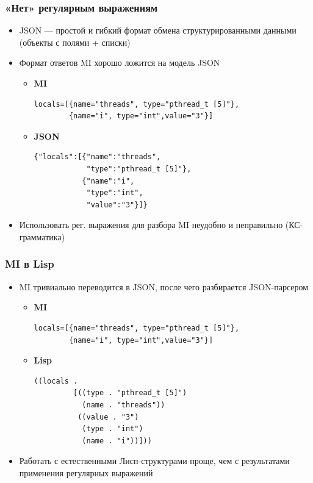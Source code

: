 \documentclass[onlymath]{beamer}
\begin{document}
\begin{frame}[fragile]
  \frametitle{«Нет» регулярным выражениям}
  \begin{itemize}
  \item JSON — простой и гибкий формат обмена структурированными
    данными (объекты с полями + списки)
  \item Формат ответов MI хорошо ложится на модель JSON
    \begin{itemize}
    \item \textbf{MI}
\begin{lstlisting}
locals=[{name="threads", type="pthread_t [5]"},
        {name="i", type="int",value="3"}]
\end{lstlisting}

    \item \textbf{JSON}
\begin{lstlisting}
{"locals":[{"name":"threads", 
            "type":"pthread_t [5]"},
           {"name":"i", 
            "type":"int", 
            "value":"3"}]}
\end{lstlisting}
    \end{itemize}
  \item Использовать рег. выражения для разбора MI неудобно и
    неправильно (КС-грамматика)
  \end{itemize}
\end{frame}

\begin{frame}[fragile]
  \frametitle{MI в Lisp}
  \begin{itemize}
  \item MI тривиально переводится в JSON, после чего разбирается
    JSON-парсером
    \begin{itemize}
    \item \textbf{MI}
\begin{lstlisting}
locals=[{name="threads", type="pthread_t [5]"},
        {name="i", type="int",value="3"}]
\end{lstlisting}
    \item \textbf{Lisp}
\begin{lstlisting}
((locals .
         [((type . "pthread_t [5]")
           (name . "threads"))
          ((value . "3")
           (type . "int")
           (name . "i"))]))
\end{lstlisting}
    \end{itemize}

  \item Работать с естественными Лисп-структурами проще, чем с
    результатами применения регулярных выражений
  \end{itemize}
\end{frame}
\end{document}
